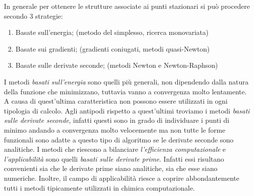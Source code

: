 \documentclass[oneside]{amsbook}
\numberwithin{section}{chapter}
\numberwithin{equation}{section}
\numberwithin{figure}{section}
\begin{document}
In generale per ottenere le strutture associate ai punti stazionari si può procedere secondo 3 strategie:
\begin{enumerate}
\item Basate sull'energia; (metodo del simplesso, ricerca monovariata)
\item Basate sui gradienti; (gradienti coniugati, metodi quasi-Newton)
\item Basate sulle derivate seconde; (metodi Newton e Newton-Raphson) 
\end{enumerate}
I metodi \emph{basati sull'energia} sono quelli più generali, non dipendendo dalla natura della funzione che minimizzano, tuttavia vanno a convergenza molto lentamente. A causa di quest'ultima caratteristica non possono essere utilizzati in ogni tipologia di calcolo.
Agli antipodi rispetto a quest'ultimi troviamo i metodi \emph{basati sulle derivate seconde}, infatti questi sono in grado di individuare i punti di minimo andando a convergenza molto velocemente ma non tutte le forme funzionali sono adatte a questo tipo di algoritmo se le derivate seconde sono analitiche.
I metodi che riescono a bilanciare \emph{l'efficienza computazionale} e \emph{l'applicabilità} sono quelli \emph{basati sulle derivate prime}. Infatti essi risultano convenienti sia che le derivate prime siano analitiche, sia che esse siano numeriche. Inoltre, il campo di applicabilità riesce a coprire abbondantemente tutti i metodi tipicamente utilizzati in chimica computazionale.
\end{document}

